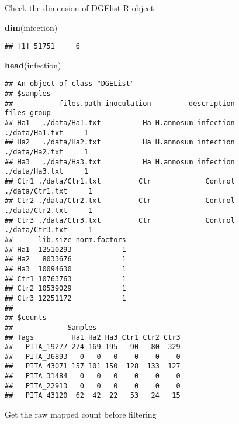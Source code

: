 \documentclass[
]{article}
\newenvironment{Shaded}{\begin{snugshade}}{\end{snugshade}}
\newcommand{\FunctionTok}[1]{\textcolor[rgb]{0.13,0.29,0.53}{\textbf{#1}}}
\newcommand{\NormalTok}[1]{#1}
\newcommand{\OtherTok}[1]{\textcolor[rgb]{0.56,0.35,0.01}{#1}}
\newcommand{\SpecialCharTok}[1]{\textcolor[rgb]{0.81,0.36,0.00}{\textbf{#1}}}
\begin{document}
Check the dimension of DGElist R object

\begin{Shaded}
\begin{Highlighting}[]
\FunctionTok{dim}\NormalTok{(infection)}
\end{Highlighting}
\end{Shaded}

\begin{verbatim}
## [1] 51751     6
\end{verbatim}

\begin{Shaded}
\begin{Highlighting}[]
\FunctionTok{head}\NormalTok{(infection)}
\end{Highlighting}
\end{Shaded}

\begin{verbatim}
## An object of class "DGEList"
## $samples
##           files.path inoculation         description           files group
## Ha1   ./data/Ha1.txt          Ha H.annosum infection  ./data/Ha1.txt     1
## Ha2   ./data/Ha2.txt          Ha H.annosum infection  ./data/Ha2.txt     1
## Ha3   ./data/Ha3.txt          Ha H.annosum infection  ./data/Ha3.txt     1
## Ctr1 ./data/Ctr1.txt         Ctr             Control ./data/Ctr1.txt     1
## Ctr2 ./data/Ctr2.txt         Ctr             Control ./data/Ctr2.txt     1
## Ctr3 ./data/Ctr3.txt         Ctr             Control ./data/Ctr3.txt     1
##      lib.size norm.factors
## Ha1  12510293            1
## Ha2   8033676            1
## Ha3  10094630            1
## Ctr1 10763763            1
## Ctr2 10539029            1
## Ctr3 12251172            1
## 
## $counts
##             Samples
## Tags         Ha1 Ha2 Ha3 Ctr1 Ctr2 Ctr3
##   PITA_19277 274 169 195   90   80  329
##   PITA_36893   0   0   0    0    0    0
##   PITA_43071 157 101 150  128  133  127
##   PITA_31484   0   0   0    0    0    0
##   PITA_22913   0   0   0    0    0    0
##   PITA_43120  62  42  22   53   24   15
\end{verbatim}

Get the raw mapped count before filtering

\begin{Shaded}
\end{Shaded}
\end{document}
